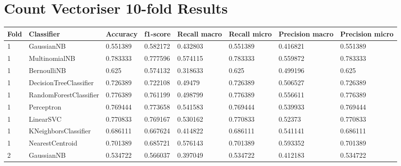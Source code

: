 \documentclass{article}
\begin{document}
\section{Count Vectoriser 10-fold Results}
\begin{table}[h]
\begin{tabular}{llllllll}
\textbf{Fold} & \textbf{Classifier}    & \textbf{Accuracy} & \textbf{f1-score} & \textbf{Recall macro} & \textbf{Recall micro} & \textbf{Precision macro} & \textbf{Precision micro} \\ \hline
1             & GaussianNB             & 0.551389          & 0.582172          & 0.432803              & 0.551389              & 0.416821                 & 0.551389                 \\
1             & MultinomialNB          & 0.783333          & 0.777596          & 0.574115              & 0.783333              & 0.559872                 & 0.783333                 \\
1             & BernoulliNB            & 0.625             & 0.574132          & 0.318633              & 0.625                 & 0.499196                 & 0.625                    \\
1             & DecisionTreeClassifier & 0.726389          & 0.722108          & 0.49479               & 0.726389              & 0.506527                 & 0.726389                 \\
1             & RandomForestClassifier & 0.776389          & 0.761199          & 0.498799              & 0.776389              & 0.556611                 & 0.776389                 \\
1             & Perceptron             & 0.769444          & 0.773658          & 0.541583              & 0.769444              & 0.539933                 & 0.769444                 \\
1             & LinearSVC              & 0.770833          & 0.769167          & 0.530162              & 0.770833              & 0.52373                  & 0.770833                 \\
1             & KNeighborsClassifier   & 0.686111          & 0.667624          & 0.414822              & 0.686111              & 0.541141                 & 0.686111                 \\
1             & NearestCentroid        & 0.701389          & 0.685721          & 0.576143              & 0.701389              & 0.593352                 & 0.701389                 \\
2             & GaussianNB             & 0.534722          & 0.566037          & 0.397049              & 0.534722              & 0.412183                 & 0.534722                 \\

\end{tabular}
\end{table}
\end{document}
